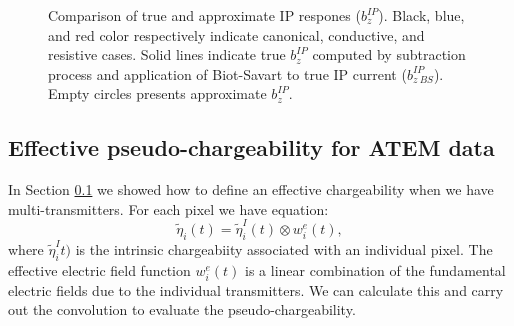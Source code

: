 \documentclass[extra,mreferee]{gji}
\newcommand{\peta}{\tilde{\eta}}
\begin{document}
\begin{figure}
  \caption{Comparison of true and approximate IP respones ($b_z^{IP}$). Black, blue, and red color respectively indicate canonical, conductive, and resistive cases. Solid lines indicate true $b_z^{IP}$ computed by subtraction process and application of Biot-Savart to true IP current ($b_{z \ BS}^{IP}$). Empty circles presents approximate $b_z^{IP}$. }
  \label{F:True_vs_approx_IPresp}
\end{figure}
\clearpage


\subsection{Effective pseudo-chargeability for ATEM data}
\label{subsection: Effective pseudo-chargeability for ATEM data}

In Section \ref{subsection: Effective pseudo-chargeability for ATEM data} we showed how to define an effective chargeability when we have multi-transmitters. For each pixel we have
equation: 
\begin{equation}
  \peta_i(t) = \peta_i^I(t) \otimes  w_i^e(t),
\end{equation}
where $\peta_i^It)$ is the intrinsic chargeabiity associated with an individual pixel. The effective electric field function $w_i^e(t)$ is a linear combination of the fundamental electric fields due to the individual transmitters. We can calculate this and carry out the convolution to evaluate the pseudo-chargeability. 
\end{document}
